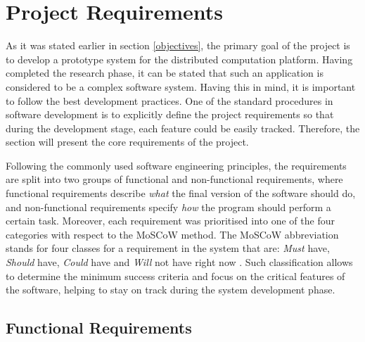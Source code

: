 \documentclass[10pt]{report}
\begin{document}
\section{Project Requirements}


As it was stated earlier in section \ref{objectives}, the primary goal of the project is to develop a prototype system for the distributed computation platform. Having completed the research phase, it can be stated that such an application is considered to be a complex software system. Having this in mind, it is important to follow the best development practices. One of the standard procedures in software development is to explicitly define the project requirements so that during the development stage, each feature could be easily tracked. Therefore, the section will present the core requirements of the project.
\newline

Following the commonly used software engineering principles, the requirements are split into two groups of functional and non-functional requirements, where functional requirements describe \textit{what} the final version of the software should do, and non-functional requirements specify \textit{how} the program should perform a certain task. Moreover, each requirement was prioritised into one of the four categories with respect to the MoSCoW method. The MoSCoW abbreviation stands for four classes for a requirement in the system that are: \textit{Must} have, \textit{Should} have, \textit{Could} have and \textit{Will} not have right now \cite{moscow}. Such classification allows to determine the minimum success criteria and focus on the critical features of the software, helping to stay on track during the system development phase.

\subsection{Functional Requirements} \label{functional}
\end{document}
